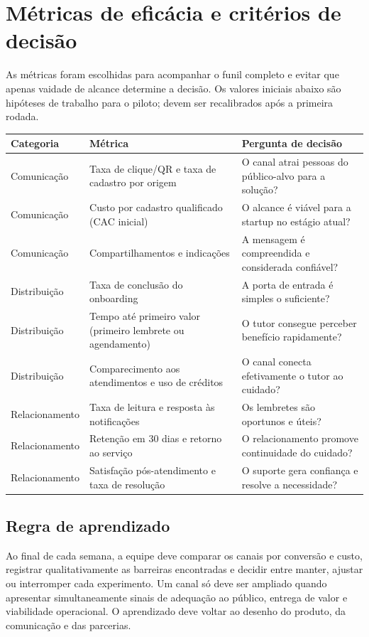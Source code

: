 \section{Métricas de eficácia e critérios de decisão}
\label{sec:metricas}

As métricas foram escolhidas para acompanhar o funil completo e evitar que apenas vaidade de alcance determine a decisão. Os valores iniciais abaixo são hipóteses de trabalho para o piloto; devem ser recalibrados após a primeira rodada.

\begin{longtable}{p{}p{}p{}}
\toprule
\textbf{Categoria} & \textbf{Métrica} & \textbf{Pergunta de decisão}\\
\midrule
\endhead
Comunicação & Taxa de clique/QR e taxa de cadastro por origem & O canal atrai pessoas do público-alvo para a solução?\\
Comunicação & Custo por cadastro qualificado (CAC inicial) & O alcance é viável para a startup no estágio atual?\\
Comunicação & Compartilhamentos e indicações & A mensagem é compreendida e considerada confiável?\\
\addlinespace
Distribuição & Taxa de conclusão do onboarding & A porta de entrada é simples o suficiente?\\
Distribuição & Tempo até primeiro valor (primeiro lembrete ou agendamento) & O tutor consegue perceber benefício rapidamente?\\
Distribuição & Comparecimento aos atendimentos e uso de créditos & O canal conecta efetivamente o tutor ao cuidado?\\
\addlinespace
Relacionamento & Taxa de leitura e resposta às notificações & Os lembretes são oportunos e úteis?\\
Relacionamento & Retenção em 30 dias e retorno ao serviço & O relacionamento promove continuidade do cuidado?\\
Relacionamento & Satisfação pós-atendimento e taxa de resolução & O suporte gera confiança e resolve a necessidade?\\
\bottomrule
\end{longtable}

\subsection{Regra de aprendizado}
Ao final de cada semana, a equipe deve comparar os canais por conversão e custo, registrar qualitativamente as barreiras encontradas e decidir entre manter, ajustar ou interromper cada experimento. Um canal só deve ser ampliado quando apresentar simultaneamente sinais de adequação ao público, entrega de valor e viabilidade operacional. O aprendizado deve voltar ao desenho do produto, da comunicação e das parcerias.

